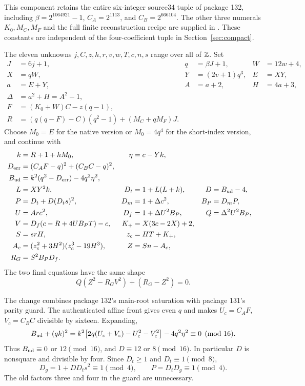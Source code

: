 This component retains the entire six-integer source34 tuple of package 132,
including $\beta=2^{1064921}-1$, $C_A=2^{1113}$, and $C_B=2^{666104}$.
The other three numerals $K_0,M_C,M_F$ and the full finite reconstruction
recipe are supplied in . These constants
are independent of the four-coefficient tuple in Section~\ref{sec:compact}.

The eleven unknowns $j,C,z,h,r,v,w,T,c,n,s$ range over all of $\mathbb Z$. Set
\begin{align*}
 J&=6j+1,&q&=\beta J+1,&W&=12w+4,\\
 X&=qW,&Y&=(2v+1)q^3,&E&=XY,\\
 a&=E+Y,&A&=a+2,&H&=4a+3,\\
 \Delta&=a^2+H=A^2-1,\\
 F&=(K_0+W)C-z(q-1),\\
 R&=(q(q-F)-C)(q^2-1)+(M_C+qM_F)J.
\end{align*}
Choose $M_0=E$ for the native version or $M_0=4q^4$ for the short-index
version, and continue with
\begin{align*}
 k&=R+1+hM_0,&\eta&=c-Yk,\\
 D_{\rm err}&=(C_AF-q)^2+(C_BC-q)^2,\\
 B_{\rm ud}&=k^2(q^2-D_{\rm err})-4q^2\eta^2,\\
 L&=XY^2k,&D_t&=1+L(L+k),&D&=B_{\rm ud}-4,\\
 P&=D_t+D(D_ts)^2,&D_m&=1+\Delta c^2,&B_P&=D_mP,\\
 U&=Arc^2,&D_f&=1+\Delta U^2B_P,&Q&=\Delta^2U^2B_P,\\
 V&=D_f(c-R+4UB_PT)-c,&K_+&=X(3c-2X)+2,\\
 S&=srH,&z_c&=HT+K_+,\\
 A_c&=(z_c^2+3H^2)(z_c^3-19H^3),&Z&=Sn-A_c,\\
 R_G&=S^2B_PD_f.
\end{align*}
The two final equations have the same shape
\begin{equation}\label{eq:signed}
 \boxed{Q(Z^2-R_GV^2)+(R_G-Z^2)=0.}
\end{equation}

The change combines package 132's main-root saturation with package 131's
parity guard. The authenticated affine front gives even $q$ and makes
$U_c=C_AF$, $V_c=C_BC$ divisible by sixteen. Expanding,
\[
 B_{\rm ud}+(qk)^2
 =k^2\bigl[2q(U_c+V_c)-U_c^2-V_c^2\bigr]-4q^2\eta^2
 \equiv0\pmod{16}.
\]
Thus $B_{\rm ud}\equiv0$ or $12\pmod{16}$, and
$D\equiv12$ or $8\pmod{16}$. In particular $D$ is nonsquare and
divisible by four. Since $D_t\ge1$ and $D_t\equiv1\pmod8$,
\[
 D_g=1+DD_ts^2\equiv1\pmod4,\qquad P=D_tD_g\equiv1\pmod4.
\]
The old factors three and four in the guard are unnecessary.

